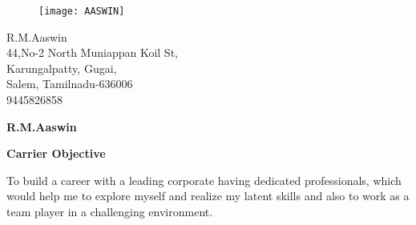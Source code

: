 \documentclass[a4paper,12pt,final]{memoir}
\newcommand{\SmallSep}{\vspace{0.5em}}
\newcommand{\CVSection}[1]
	{\Large\textbf{#1}\par
	\SmallSep\normalsize\normalfont}
\newcommand{\CVItem}[1]
	{\textbf{\color{RoyalBlue} #1}}
\begin{document}
\begin{figure}
	\hfill
	\texttt{[image: AASWIN]}
	\vspace{-7cm}
\end{figure}

\begin{flushright}\small
	R.M.Aaswin \\
	44,No-2 North Muniappan Koil St,\\
	Karungalpatty, Gugai, \\
	Salem, Tamilnadu-636006\\
	9445826858

\end{flushright}\normalsize
\framebreak


\Huge\bfseries {\color{RoyalBlue} R.M.Aaswin} \\


\normalsize\normalfont

\CVSection{Carrier Objective}
To build a career with a leading corporate having dedicated professionals, which would help me to explore myself and realize my latent skills and also to work as a team player in a challenging environment.
\SmallSep
\end{document}
